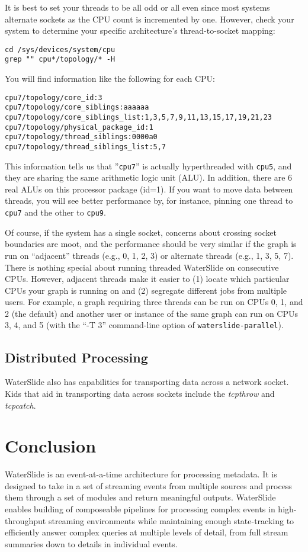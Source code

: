 \documentclass[11pt]{article}
\begin{document}
It is best to set your threads to be all odd or all even since most systems alternate sockets as
the CPU count is incremented by one. However, check your system to determine your
specific architecture's thread-to-socket mapping:
\begin{lstlisting}
cd /sys/devices/system/cpu
grep "" cpu*/topology/* -H
\end{lstlisting}
You will find information like the following for each CPU:
\begin{lstlisting}
cpu7/topology/core_id:3
cpu7/topology/core_siblings:aaaaaa
cpu7/topology/core_siblings_list:1,3,5,7,9,11,13,15,17,19,21,23
cpu7/topology/physical_package_id:1
cpu7/topology/thread_siblings:0000a0
cpu7/topology/thread_siblings_list:5,7
\end{lstlisting}
This information tells us that ''\texttt{cpu7}'' is actually hyperthreaded with \texttt{cpu5}, and they
are sharing the same arithmetic logic unit (ALU). In addition, there are 6 real ALUs on this
processor package (id=1). If you want to move data between threads, you will see better performance
by, for instance, pinning one thread to \texttt{cpu7} and the other to \texttt{cpu9}.

Of course, if the system has a single socket, concerns about crossing socket boundaries are moot, and the performance should be very
similar if the graph is run on ``adjacent'' threads (e.g., 0, 1, 2, 3) or alternate threads (e.g.,
1, 3, 5, 7). There is nothing special about running threaded WaterSlide on consecutive CPUs. However,
adjacent threads make it easier to (1) locate which particular CPUs your graph is running on and
(2) segregate different jobs from multiple users. For example, a graph requiring three threads can
be run on CPUs 0, 1, and 2 (the default) and another user or instance of the same graph can run
on CPUs 3, 4, and 5 (with the ``-T 3'' command-line option of \texttt{waterslide-parallel}).

\subsection{Distributed Processing}

WaterSlide also has capabilities for transporting data across a network socket. Kids that aid in
transporting data across sockets include the \emph{tcpthrow} and \emph{tcpcatch}.

\section{Conclusion}
WaterSlide is an event-at-a-time architecture for processing metadata.   It is designed to
take in a set of streaming events from multiple sources and process them through a set
of modules and return meaningful outputs. WaterSlide enables building of composeable pipelines for processing complex events in high-throughput streaming environments while maintaining enough state-tracking to efficiently answer complex queries at multiple levels of detail, from full stream summaries down to details in individual events. 
\end{document}
